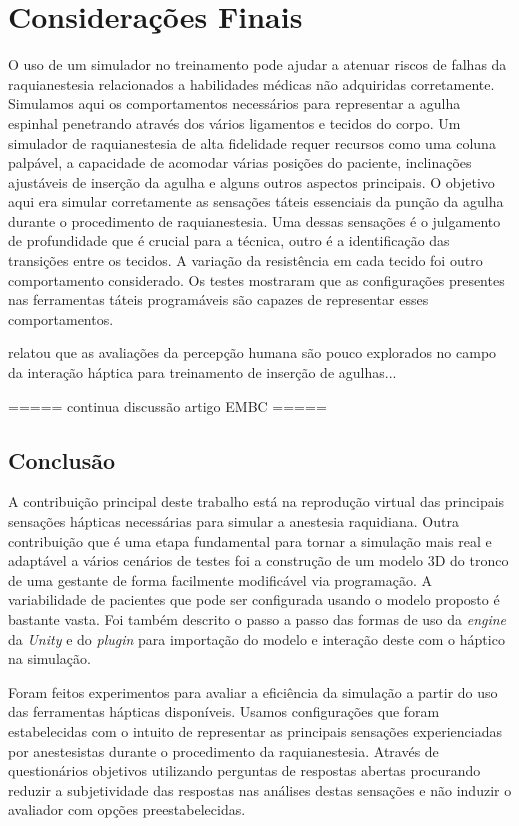 \chapter{Considerações Finais} \label{cap:cap6}

O uso de um simulador no treinamento pode ajudar a atenuar riscos de falhas da raquianestesia relacionados a habilidades médicas não adquiridas corretamente. Simulamos aqui os comportamentos necessários para representar a agulha espinhal penetrando através dos vários ligamentos e tecidos do corpo. Um simulador de raquianestesia de alta fidelidade requer recursos como uma coluna palpável, a capacidade de acomodar várias posições do paciente, inclinações ajustáveis de inserção da agulha e alguns outros aspectos principais. O objetivo aqui era simular corretamente as sensações táteis essenciais da punção da agulha durante o procedimento de raquianestesia. Uma dessas sensações é o julgamento de profundidade que é crucial para a técnica, outro é a identificação das transições entre os tecidos.
A variação da resistência em cada tecido foi outro comportamento
considerado. Os testes mostraram que as configurações presentes nas ferramentas táteis programáveis são capazes de representar esses comportamentos.

 \textcite{Correa2019} relatou que as avaliações da percepção humana
são pouco explorados no campo da interação háptica para treinamento de inserção de agulhas...

===== continua discussão artigo EMBC =====


\section{Conclusão}
\label{sec:conclusão}

A contribuição principal deste trabalho está na reprodução virtual das principais sensações hápticas necessárias para simular a anestesia raquidiana. Outra contribuição que é uma etapa fundamental para tornar a simulação mais real e adaptável a vários cenários de testes foi a construção de um modelo 3D do tronco de uma gestante de forma facilmente modificável via programação. A variabilidade de pacientes que pode ser configurada usando o modelo proposto é bastante vasta. Foi também descrito o passo a passo das formas de uso da \textit{engine} da \textit{Unity} e do \textit{plugin} para importação do modelo e interação deste com o háptico na simulação. 

Foram feitos experimentos para avaliar a eficiência da simulação a partir do uso das ferramentas hápticas disponíveis. Usamos configurações que foram estabelecidas com o intuito de representar as principais sensações experienciadas por anestesistas durante o procedimento da raquianestesia. Através de questionários objetivos utilizando perguntas de respostas abertas procurando reduzir a subjetividade das respostas nas análises destas sensações e não induzir o avaliador com opções preestabelecidas.  

